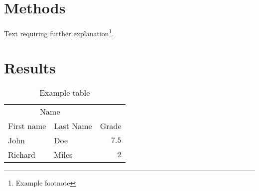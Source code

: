 \documentclass[twoside]{article}
\begin{document}
%
%
%
%
%
%







\section{Methods}



Text requiring further explanation\footnote{Example footnote}.


\section{Results}

\begin{table}
\caption{Example table}
\centering
\begin{tabular}{llr}
\toprule
\multicolumn{2}{c}{Name} \\
\cmidrule(r){1-2}
First name & Last Name & Grade \\
\midrule
John & Doe & $7.5$ \\
Richard & Miles & $2$ \\
\bottomrule
\end{tabular}
\end{table}
\end{document}
